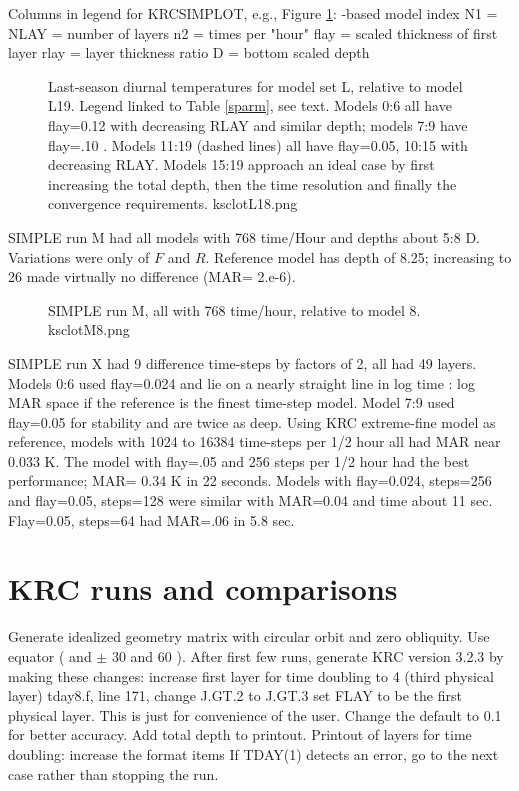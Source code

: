 \documentclass{article}
\begin{document}
Columns in legend for KRCSIMPLOT, e.g., Figure \ref{ksclotL18}: 
-based model index
\qi N1 = NLAY = number of layers
\qi n2 = times per "hour" 
\qi flay = scaled thickness of first layer
\qi rlay = layer thickness ratio
\qi D = bottom scaled depth


\begin{figure}[!ht] 
\caption[Deltas for set L]{ Last-season diurnal temperatures for model set L,
  relative to model L19. Legend linked to Table \ref{sparm}, see text. Models 0:6
  all have flay=0.12 with decreasing RLAY and similar depth; models 7:9 have
  flay=.10 . Models 11:19 (dashed lines) all have flay=0.05, 10:15 with
  decreasing RLAY. Models 15:19 approach an ideal case by first increasing the
  total depth, then the time resolution and finally the convergence
  requirements.
\label{ksclotL18} ksclotL18.png }
\end{figure} 

SIMPLE run M had all models with 768 time/Hour and depths about 5:8 D. Variations were only of $F$ and $R$. Reference model has depth of 8.25; increasing to 26 made virtually no difference (MAR= 2.e-6).

\begin{figure}[!ht] 
\caption[SIMPLE run M]{SIMPLE run M, all with 768 time/hour, relative to model 8.  
\label{ksclotM8}  ksclotM8.png }
\end{figure} 

SIMPLE run X had 9 difference time-steps by factors of 2, all had 49
layers. Models 0:6 used flay=0.024 and lie on a nearly straight line in log time
: log MAR space if the reference is the finest time-step model. Model 7:9 used
flay=0.05 for stability and are twice as deep.  Using KRC extreme-fine model as
reference, models with 1024 to 16384 time-steps per 1/2 hour all had MAR near
0.033 K. The model with flay=.05 and 256 steps per 1/2 hour had the best
performance; MAR= 0.34 K in 22 seconds.  Models with flay=0.024, steps=256 and
flay=0.05, steps=128 were similar with MAR=0.04 and time about 11
sec. Flay=0.05, steps=64 had MAR=.06 in 5.8 sec.

\clearpage

\section{KRC runs and comparisons} %
Generate idealized geometry matrix with circular orbit and zero obliquity. Use equator ( and $\pm$ 30 and 60 \qd ). After first few runs, generate KRC version 3.2.3 by making these changes:
\qi increase first layer for time doubling to 4 (third physical layer)
\qiii tday8.f, line 171, change J.GT.2 to J.GT.3
\qi set FLAY to be the first physical layer. This is just for convenience of the user.  
\qii Change the default to 0.1 for better accuracy.
\qi Add total depth to printout.
\qi Printout of layers for time doubling: increase the format items
\qi If TDAY(1) detects an error, go to the next case rather than stopping the run.
\end{document}
